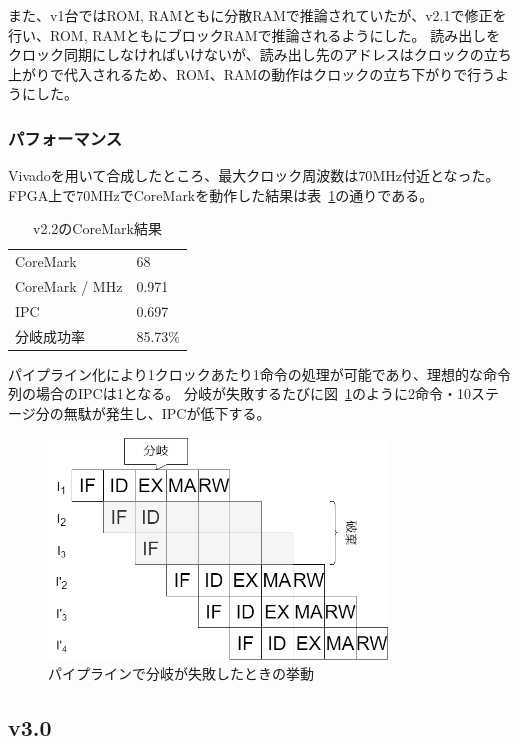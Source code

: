 \documentclass[dvipdfmx,10pt,a4paper,titlepage]{jsarticle}
\begin{document}
    また、v1台ではROM, RAMともに分散RAMで推論されていたが、v2.1で修正を行い、ROM, RAMともにブロックRAMで推論されるようにした。
    読み出しをクロック同期にしなければいけないが、読み出し先のアドレスはクロックの立ち上がりで代入されるため、ROM、RAMの動作はクロックの立ち下がりで行うようにした。

    \subsubsection{パフォーマンス}
    Vivadoを用いて合成したところ、最大クロック周波数は$70\mathrm{MHz}$付近となった。
    FPGA上で$70\mathrm{MHz}$でCoreMarkを動作した結果は表~\ref{tab:v2.2}の通りである。
    \begin{table}[h]
        \begin{center}
            \caption{v2.2のCoreMark結果}\label{tab:v2.2}
            \begin{tabular}{ll}
                CoreMark & 68 \\
                CoreMark / MHz & 0.971 \\
                IPC & 0.697 \\
                分岐成功率 & 85.73\% \\
            \end{tabular}
        \end{center}
    \end{table}
    パイプライン化により1クロックあたり1命令の処理が可能であり、理想的な命令列の場合のIPCは1となる。
    分岐が失敗するたびに図~\ref{fig:predictfail}のように2命令・10ステージ分の無駄が発生し、IPCが低下する。
    \begin{figure}
        \centering
        \includegraphics[width=9cm]{figure/predict_fail.png}
        \caption{パイプラインで分岐が失敗したときの挙動}\label{fig:predictfail}
    \end{figure}
    \subsection{v3.0}
\end{document}
